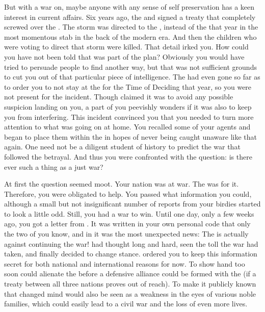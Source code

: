 \documentclass[char]{GL2020}
\begin{document}
But with a war on, maybe anyone with any sense of self preservation has a keen interest in current affairs. Six years ago, the \pFarm{} and \pTech{} signed a treaty that completely screwed over the \pShippies{}. The storm was directed to the \pShip{}, instead of the \pTech{} that year in the most momentous stab in the back of the modern era. And then the children who were voting to direct that storm were killed. That detail irked you. How could you have not been told that was part of the plan? Obviously you would have tried to persuade people to find another way, but that was not sufficient grounds to cut you out of that particular piece of intelligence. The \cQueen{\Majesty} had even gone so far as to order you to not stay at the \pSc{} for the Time of Deciding that year, so you were not present for the incident. Though \cQueen{\they} claimed it was to avoid any possible suspicion landing on you, a part of you peevishly wonders if it was also to keep you from interfering. This incident convinced you that you needed to turn more attention to what was going on at home. You recalled some of your agents and began to place them within the \pFarm{} in hopes of never being caught unaware like that again. One need not be a diligent student of history to predict the war that followed the betrayal. And thus you were confronted with the question: is there ever such a thing as a just war?

At first the question seemed moot. Your nation was at war. The \cQueen{\Majesty} was for it. Therefore, you were obligated to help. You passed what information you could, although a small but not insignificant number of reports from your birdies started to look a little odd. Still, you had a war to win. Until one day, only a few weeks ago, you got a letter from \cQueen{\Majesty} \cQueen{} \cQueen{\themself}. It was written in your own personal code that only the two of you know, and in it was the most unexpected news: The \cQueen{\Majesty} is actually against continuing the war! \cQueen{\They} had thought long and hard, seen the toll the war had taken, and finally decided to change \cQueen{\their} stance. \cQueen{\They} ordered you to keep this information secret for both national and international reasons for now. To show \cQueen{\their} hand too soon could alienate the \pTech{} before a defensive alliance could be formed with the \pShip{} (if a treaty between all three nations proves out of reach). To make it publicly known that \cQueen{\they} changed \cQueen{\their} mind would also be seen as a weakness in the eyes of various \pFarm{} noble families, which could easily lead to a civil war and the loss of even more lives.
\end{document}
